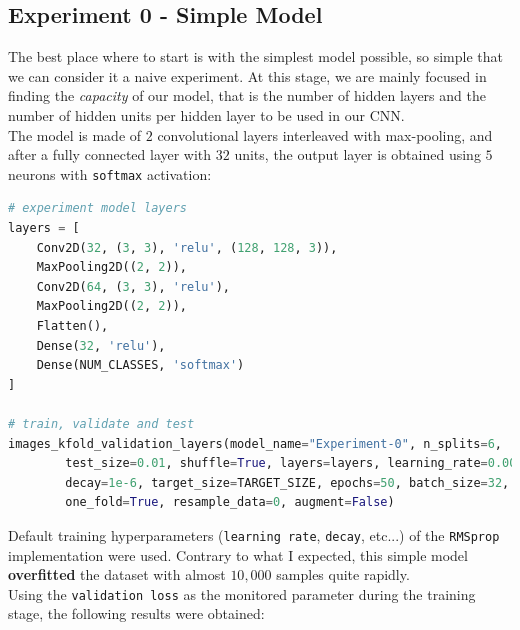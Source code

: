 \documentclass[11pt,a4paper]{article}
\begin{document}
\subsection{Experiment 0 - Simple Model}
The best place where to start is with the simplest model possible, so simple that we can consider it a naive experiment. At this stage, we are mainly focused in finding the \textit{capacity} of our model, that is the number of hidden layers and the number of hidden units per hidden layer to be used in our CNN.\\
The model is made of $2$ convolutional layers interleaved with max-pooling, and after a fully connected layer with $32$ units, the output layer is obtained using $5$ neurons with \texttt{softmax} activation:
\begin{lstlisting}[language=Python,frame=single]
# experiment model layers
layers = [
    Conv2D(32, (3, 3), 'relu', (128, 128, 3)),
    MaxPooling2D((2, 2)),
    Conv2D(64, (3, 3), 'relu'),
    MaxPooling2D((2, 2)),
    Flatten(),
    Dense(32, 'relu'),
    Dense(NUM_CLASSES, 'softmax')
]

# train, validate and test
images_kfold_validation_layers(model_name="Experiment-0", n_splits=6,
        test_size=0.01, shuffle=True, layers=layers, learning_rate=0.001,
        decay=1e-6, target_size=TARGET_SIZE, epochs=50, batch_size=32,
        one_fold=True, resample_data=0, augment=False)
\end{lstlisting}
Default training hyperparameters (\texttt{learning rate}, \texttt{decay}, etc...) of the \texttt{RMSprop} implementation were used. Contrary to what I expected, this simple model \textbf{overfitted} the dataset with almost $10,000$ samples quite rapidly.\\
Using the \texttt{validation loss} as the monitored parameter during the training stage, the following results were obtained:
\end{document}
